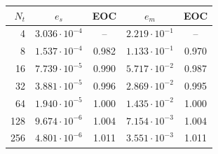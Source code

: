 \begin{tabular}{rcccc}
\toprule
$N_t$ & $e_s$ & EOC & $e_m$ & EOC \\
\midrule
4 & $3.036 \cdot 10^{-4}$ & -- & $2.219 \cdot 10^{-1}$ & -- \\
8 & $1.537 \cdot 10^{-4}$ & 0.982 & $1.133 \cdot 10^{-1}$ & 0.970 \\
16 & $7.739 \cdot 10^{-5}$ & 0.990 & $5.717 \cdot 10^{-2}$ & 0.987 \\
32 & $3.881 \cdot 10^{-5}$ & 0.996 & $2.869 \cdot 10^{-2}$ & 0.995 \\
64 & $1.940 \cdot 10^{-5}$ & 1.000 & $1.435 \cdot 10^{-2}$ & 1.000 \\
128 & $9.674 \cdot 10^{-6}$ & 1.004 & $7.154 \cdot 10^{-3}$ & 1.004 \\
256 & $4.801 \cdot 10^{-6}$ & 1.011 & $3.551 \cdot 10^{-3}$ & 1.011 \\
\bottomrule
\end{tabular}
